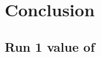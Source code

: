 
\thispagestyle{myheadings} %

\chapter{Conclusion}
\label{chapter:Conclusion}

\section{Run 1 value of \amu}
\label{sec:FinalValue}



\cleardoublepage
